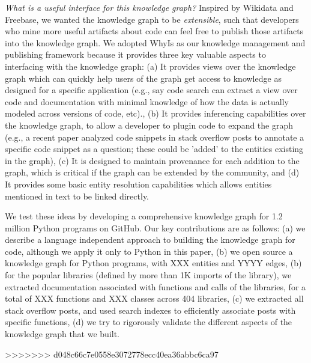 \textit{What is a useful interface for this knowledge graph?}
Inspired by Wikidata and Freebase, we wanted the knowledge graph to be \textit{extensible}, such that developers who mine more useful artifacts about code can feel free to publish those artifacts into the knowledge graph.  We adopted WhyIs \cite{} as our knowledge management and publishing framework because it provides three key valuable aspects to interfacing with the knowledge graph: (a) It provides views over the knowledge graph which can quickly help users of the graph get access to knowledge as designed for a specific application (e.g., say code search can extract a view over code and documentation with minimal knowledge of how the data is actually modeled across versions of code, etc)., (b) It provides inferencing capabilities over the knowledge graph, to allow a developer to plugin code to expand the graph (e.g., a recent paper analyzed code snippets in stack overflow posts to annotate a specific code snippet as a question; these could be 'added' to the entities existing in the graph), (c) It is designed to maintain provenance for each addition to the graph, which is critical if the graph can be extended by the community, and (d) It provides some basic entity resolution capabilities which allows entities mentioned in text to be linked directly.

We test these ideas by developing a comprehensive knowledge graph for 1.2 million Python programs on GitHub.  Our key contributions are as follows: (a) we describe a language independent approach to building the knowledge graph for code, although we apply it only to Python in this paper, (b) we open source a knowledge graph for Python programs, with XXX entities and YYYY edges, (b) for the popular libraries (defined by more than 1K imports of the library), we extracted documentation associated with functions and calls of the libraries, for a total of XXX functions and XXX classes across 404 libraries, (c) we extracted all stack overflow posts, and used search indexes to efficiently associate posts with specific functions, (d) we try to rigorously validate the different aspects of the knowledge graph that we built. 

>>>>>>> d048c66c7e0558e3072778ecc40ea36abbc6ca97
